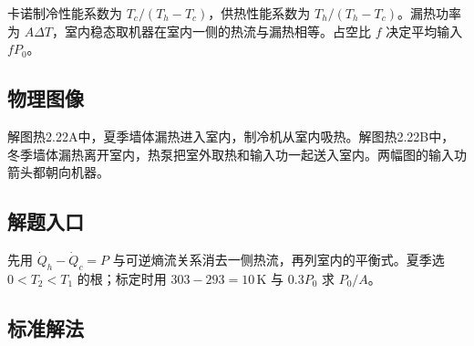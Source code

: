 \documentclass[UTF8,fontset=fandol,a4paper,11pt]{ctexart}
\begin{document}
卡诺制冷性能系数为 $T_c/(T_h-T_c)$，供热性能系数为 $T_h/(T_h-T_c)$。漏热功率为 $A\Delta T$，室内稳态取机器在室内一侧的热流与漏热相等。占空比 $f$ 决定平均输入 $fP_0$。




\subsection*{物理图像}

解图热2.22A中，夏季墙体漏热进入室内，制冷机从室内吸热。解图热2.22B中，冬季墙体漏热离开室内，热泵把室外取热和输入功一起送入室内。两幅图的输入功箭头都朝向机器。



\subsection*{解题入口}

先用 $\dot Q_h-\dot Q_c=P$ 与可逆熵流关系消去一侧热流，再列室内的平衡式。夏季选 $0<T_2<T_1$ 的根；标定时用 $303-293=10\,\mathrm K$ 与 $0.3P_0$ 求 $P_0/A$。




\subsection*{标准解法}
\end{document}
